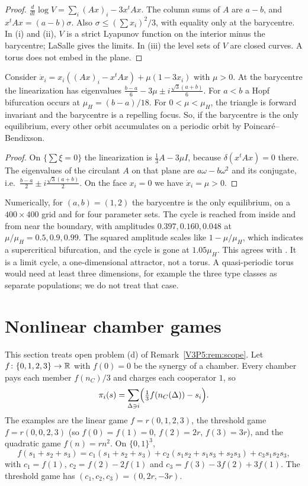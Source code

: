 \begin{proof}
$\frac{d}{dt}\log V=\sum_i(Ax)_i-3x^{t}Ax$. The column sums of $A$ are $a-b$, and
$x^{t}Ax=(a-b)\sigma$. Also $\sigma\le(\sum x_i)^{2}/3$, with equality only at the barycentre.
In (i) and (ii), $V$ is a strict Lyapunov function on the interior minus the barycentre; LaSalle
\cite{LaSalle60} gives the limits. In (iii) the level sets of $V$ are closed curves. A torus
does not embed in the plane.
\end{proof}

\begin{theorem}\label{V3P5:thm:mutation}
Consider $\dot x_i=x_i((Ax)_i-x^{t}Ax)+\mu(1-3x_i)$ with $\mu>0$. At the barycentre the
linearization has eigenvalues $\frac{b-a}6-3\mu\pm i\frac{\sqrt3(a+b)}6$. For $a<b$ a Hopf
bifurcation occurs at $\mu_H=(b-a)/18$. For $0<\mu<\mu_H$, the triangle is forward invariant and
the barycentre is a repelling focus. So, if the barycentre is the only equilibrium, every other
orbit accumulates on a periodic orbit by Poincaré--Bendixson.
\end{theorem}

\begin{proof}
On $\{\sum\xi=0\}$ the linearization is $\frac13A-3\mu I$, because $\delta(x^{t}Ax)=0$ there.
The eigenvalues of the circulant $A$ on that plane are $a\omega-b\omega^{2}$ and its conjugate,
i.e.\ $\frac{b-a}2\pm i\frac{\sqrt3(a+b)}2$. On the face $x_i=0$ we have $\dot x_i=\mu>0$.
\end{proof}

Numerically, for $(a,b)=(1,2)$ the barycentre is the only equilibrium, on a $400\times400$ grid
and for four parameter sets. The cycle is reached from inside and from near the boundary, with
amplitudes $0.397,0.160,0.048$ at $\mu/\mu_H=0.5,0.9,0.99$. The squared amplitude scales like
$1-\mu/\mu_H$, which indicates a supercritical bifurcation, and the cycle is gone at
$1.05\mu_H$. This agrees with \cite{Mob10}. It is a limit cycle, a one-dimensional attractor,
not a torus. A quasi-periodic torus would need at least three dimensions, for example the three
type classes as separate populations; we do not treat that case.

\section{Nonlinear chamber games}\label{V3P5:sec:nonlinear}

This section treats open problem (d) of Remark~\ref{V3P5:rem:scope}. Let $f\colon\{0,1,2,3\}\to\mathbb{R}$
with $f(0)=0$ be the synergy of a chamber. Every chamber pays each member $f(n_C)/3$ and charges
each cooperator $1$, so
\[
\pi_i(s)=\sum_{\Delta\ni i}\Bigl(\tfrac13f(n_C(\Delta))-s_i\Bigr).
\]
The examples are the linear game $f=r(0,1,2,3)$, the threshold game $f=r(0,0,2,3)$ (so
$f(0)=f(1)=0$, $f(2)=2r$, $f(3)=3r$), and the quadratic game $f(n)=rn^{2}$. On $\{0,1\}^{3}$,
\[
f(s_1+s_2+s_3)=c_1(s_1+s_2+s_3)+c_2(s_1s_2+s_1s_3+s_2s_3)+c_3s_1s_2s_3,
\]
with $c_1=f(1)$, $c_2=f(2)-2f(1)$ and $c_3=f(3)-3f(2)+3f(1)$. The threshold game has
$(c_1,c_2,c_3)=(0,2r,-3r)$.

